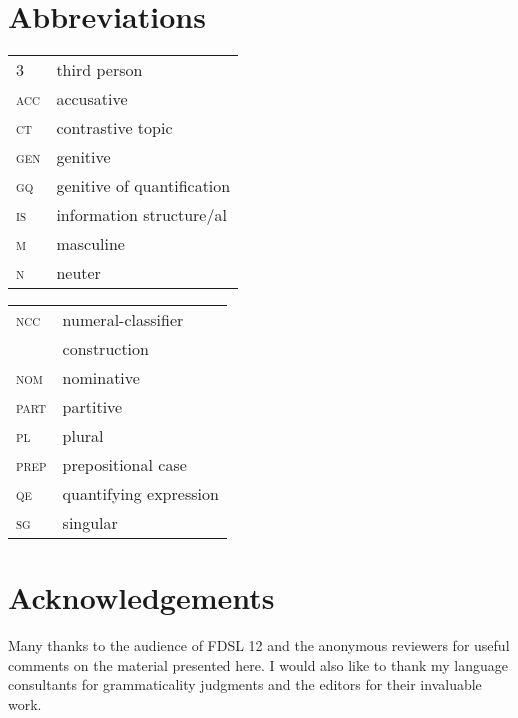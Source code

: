 \documentclass[output=paper,
modfonts,
newtxmath,
hidelinks
]{langscibook}
\begin{document}
\section*{Abbreviations}

\begin{tabularx}{.45\textwidth}{lX}
\textsc{3}&third person\\
\textsc{acc}&accusative\\
\textsc{ct}&contrastive topic\\
\textsc{gen}&genitive\\
\textsc{gq}&genitive of quantification\\
\textsc{is}&information structure/al\\
\textsc{m}&masculine\\
\textsc{n}&neuter\\
\end{tabularx}
\begin{tabularx}{.45\textwidth}{lX}
\textsc{ncc}&numeral-classifier\\
&construction\\
\textsc{nom}&nominative\\
\textsc{part}&partitive\\
\textsc{pl}&plural\\
\textsc{prep}&prepositional case\\
\textsc{qe}&quantifying expression\\
\textsc{sg}&singular\\
\end{tabularx}

\section*{Acknowledgements}

Many thanks to the audience of FDSL 12 and the anonymous reviewers for useful comments on the material presented here. I would also like to thank my language consultants for grammaticality judgments and the editors for their invaluable work.

\sloppy
\printbibliography[heading=subbibliography,notkeyword=this]
\end{document}
